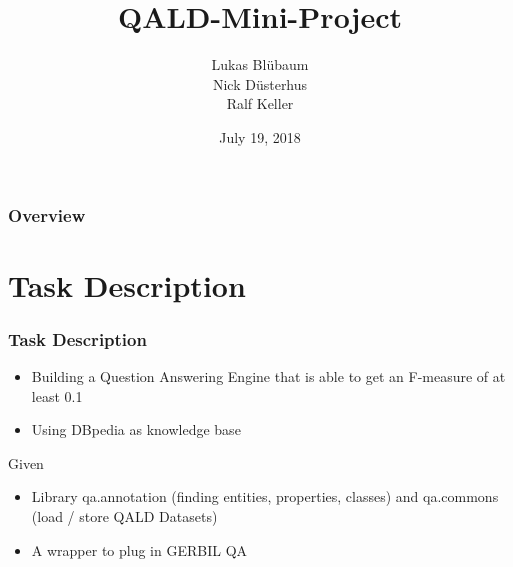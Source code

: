 \documentclass{beamer}
\title[QALD]{QALD-Mini-Project} %
\author[Data Science]{Lukas Bl{\"u}baum \\ Nick D{\"u}sterhus \\ Ralf Keller} %
\institute[UPB] %
{
University of Paderborn \\ %
\medskip
\textit{https://github.com/LukasBluebaum/QALD-Mini-Project} %
}
\date{July 19, 2018} %
\begin{document}
\begin{frame}
\titlepage %
\end{frame}

\begin{frame}
\frametitle{Overview} %
\tableofcontents %
\end{frame}


\section{Task Description} %

\begin{frame}
\frametitle{Task Description}
\begin{itemize}
	\item Building a Question Answering Engine that is able to get an F-measure of at least 0.1 
	\item Using DBpedia as knowledge base
\end{itemize}
\begin{block}{Given}
\begin{itemize}
	\item Library qa.annotation (finding entities, properties, classes) and qa.commons (load / store QALD Datasets)
	\item A wrapper to plug in GERBIL QA
\end{itemize}
\end{block}
\end{frame}
\end{document}
